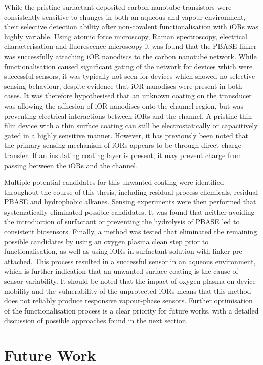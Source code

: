 \documentclass[
  a4paper,
]{scrbook}
\begin{document}
While the pristine surfactant-deposited carbon nanotube transistors were
consistently sensitive to changes in both an aqueous and vapour
environment, their selective detection ability after non-covalent
functionalisation with iORs was highly variable. Using atomic force
microscopy, Raman spectroscopy, electrical characterisation and
fluorescence microscopy it was found that the PBASE linker was
successfully attaching iOR nanodiscs to the carbon nanotube network.
While functionalisation caused significant gating of the network for
devices which were successful sensors, it was typically not seen for
devices which showed no selective sensing behaviour, despite evidence
that iOR nanodiscs were present in both cases. It was therefore
hypothesised that an unknown coating on the transducer was allowing the
adhesion of iOR nanodiscs onto the channel region, but was preventing
electrical interactions between iORs and the channel. A pristine
thin-film device with a thin surface coating can still be
electrostatically or capacitively gated in a highly sensitive manner.
However, it has previously been noted that the primary sensing mechanism
of iORs appears to be through direct charge transfer. If an insulating
coating layer is present, it may prevent charge from passing between the
iORs and the channel.

Multiple potential candidates for this unwanted coating were identified
throughout the course of this thesis, including residual process
chemicals, residual PBASE and hydrophobic alkanes. Sensing experiments
were then performed that systematically eliminated possible candidates.
It was found that neither avoiding the introduction of surfactant or
preventing the hydrolysis of PBASE led to consistent biosensors.
Finally, a method was tested that eliminated the remaining possible
candidates by using an oxygen plasma clean step prior to
functionalisation, as well as using iORs in surfactant solution with
linker pre-attached. This process resulted in a successful sensor in an
aqueous environment, which is further indication that an unwanted
surface coating is the cause of sensor variability. It should be noted
that the impact of oxygen plasma on device mobility and the
vulnerability of the unprotected iORs means that this method does not
reliably produce responsive vapour-phase sensors. Further optimisation
of the functionalisation process is a clear priority for future works,
with a detailed discussion of possible approaches found in the next
section.

\hypertarget{sec-future-work}{%
\section{Future Work}\label{sec-future-work}}
\end{document}
